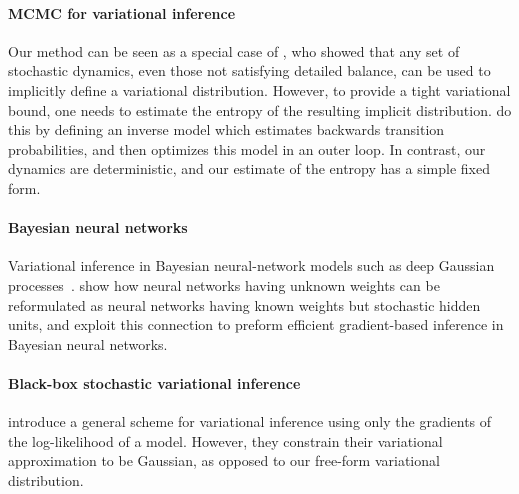 \documentclass[]{article}
\begin{document}
\paragraph{MCMC for variational inference}
Our method can be seen as a special case of \citet{Bridging14}, who showed that any set of stochastic dynamics, even those not satisfying detailed balance, can be used to implicitly define a variational distribution.
However, to provide a tight variational bound, one needs to estimate the entropy of the resulting implicit distribution.
\citet{Bridging14} do this by defining an inverse model which estimates backwards transition probabilities, and then optimizes this model in an outer loop.
In contrast, our dynamics are deterministic, and our estimate of the entropy has a simple fixed form.


\paragraph{Bayesian neural networks}
Variational inference in Bayesian neural-network models such as deep Gaussian processes~\citep{deepGPVar14}.
\citet{kingma2014efficient} show how neural networks having unknown weights can be reformulated as neural networks having known weights but stochastic hidden units, and exploit this connection to preform efficient gradient-based inference in Bayesian neural networks.


\paragraph{Black-box stochastic variational inference}
\citet{alp2014blackbox} introduce a general scheme for variational inference using only the gradients of the log-likelihood of a model.
However, they constrain their variational approximation to be Gaussian, as opposed to our free-form variational distribution.




\end{document}
